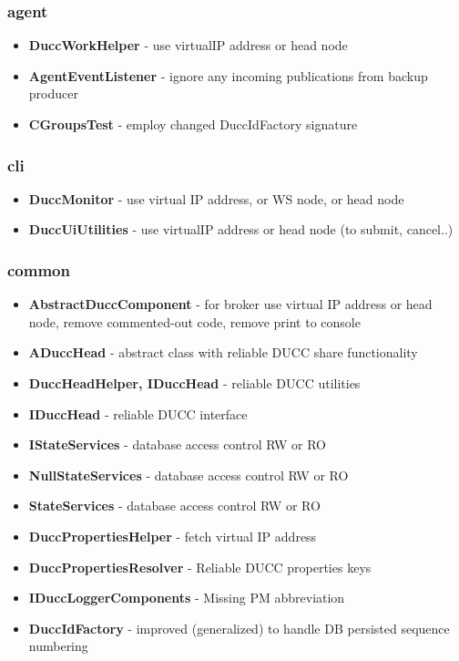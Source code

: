 \documentclass[letterpaper]{article}
\begin{document}
\subsubsection{agent}

{\renewcommand\labelitemi{}
\begin{itemize}
  \item \textbf{DuccWorkHelper} - use virtualIP address or head node
  \item \textbf{AgentEventListener} - ignore any incoming publications from backup producer
  \item \textbf{CGroupsTest} - employ changed DuccIdFactory signature
\end{itemize}
}

\subsubsection{cli}

{\renewcommand\labelitemi{}
\begin{itemize}
  \item \textbf{DuccMonitor} - use virtual IP address, or WS node, or head node
  \item \textbf{DuccUiUtilities} - use virtualIP address or head node (to submit, cancel..)
\end{itemize}
}

\subsubsection{common}

{\renewcommand\labelitemi{}
\begin{itemize}
  \item \textbf{AbstractDuccComponent} - for broker use virtual IP address or head node, remove commented-out code, remove print to console
  \item \textbf{ADuccHead} - abstract class with reliable DUCC share functionality
  \item \textbf{DuccHeadHelper, IDuccHead} - reliable DUCC utilities
  \item \textbf{IDuccHead} - reliable DUCC interface
  \item \textbf{IStateServices} - database access control RW or RO
  \item \textbf{NullStateServices} - database access control RW or RO
  \item \textbf{StateServices} - database access control RW or RO
  \item \textbf{DuccPropertiesHelper} - fetch virtual IP address
  \item \textbf{DuccPropertiesResolver} - Reliable DUCC properties keys
  \item \textbf{IDuccLoggerComponents} - Missing PM abbreviation
  \item \textbf{DuccIdFactory} - improved (generalized) to handle DB persisted sequence numbering
\end{itemize}
}
\end{document}
